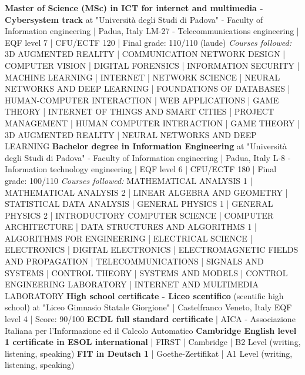 %
%
%


\begin{scholarship}
					{\textbf{Master of Science (MSc) in ICT for internet and multimedia - Cybersystem track}}
	\scholarshipentry{}
	                {at "Università degli Studi di Padova" - Faculty of Information engineering | Padua, Italy}
	\scholarshipentry{}
	                {LM-27 - Telecommunications engineering | EQF level 7 | CFU/ECTF 120 | Final grade: 110/110 (laude)}
	\scholarshipentry{}
	                {\textit{Courses followed:}}
	\scholarshipentry{}
	                {3D AUGMENTED REALITY | COMMUNICATION NETWORK DESIGN | COMPUTER VISION | DIGITAL FORENSICS | INFORMATION SECURITY | MACHINE LEARNING | INTERNET | NETWORK SCIENCE | NEURAL NETWORKS AND DEEP LEARNING | FOUNDATIONS OF DATABASES | HUMAN-COMPUTER INTERACTION | WEB APPLICATIONS | GAME THEORY | INTERNET OF THINGS AND SMART CITIES | PROJECT MANAGEMENT | HUMAN COMPUTER INTERACTION | GAME THEORY | 3D AUGMENTED REALITY | NEURAL NETWORKS AND DEEP LEARNING
	                }
					{\textbf{Bachelor degree in Information Engineering} }
	\scholarshipentry{}
	                {at "Università degli Studi di Padova" - Faculty of Information engineering | Padua, Italy}
	\scholarshipentry{}
	                {L-8 - Information technology engineering | EQF level 6 | CFU/ECTF 180 | Final grade: 100/110}
	\scholarshipentry{}
	                {\textit{Courses followed:}}
	\scholarshipentry{}
	                {MATHEMATICAL ANALYSIS 1 | MATHEMATICAL ANALYSIS 2 | LINEAR ALGEBRA AND GEOMETRY | STATISTICAL DATA ANALYSIS | GENERAL PHYSICS 1 | GENERAL PHYSICS 2 | INTRODUCTORY COMPUTER SCIENCE | COMPUTER ARCHITECTURE | DATA STRUCTURES AND ALGORITHMS 1 | ALGORITHMS FOR ENGINEERING | ELECTRICAL SCIENCE | ELECTRONICS | DIGITAL ELECTRONICS | ELECTROMAGNETIC FIELDS AND PROPAGATION | TELECOMMUNICATIONS | SIGNALS AND SYSTEMS | CONTROL THEORY | SYSTEMS AND MODELS | CONTROL ENGINEERING LABORATORY | INTERNET AND MULTIMEDIA LABORATORY
	                }
					{\textbf{High school certificate - 
					Liceo scentifico} (scentific high school)
					}
	\scholarshipentry{}
	                {at "Liceo Gimnasio Statale Giorgione" |  Castelfranco Veneto, Italy}
	\scholarshipentry{}
	                {EQF level 4 | Score: 90/100}
	                {\textbf{ECDL full standard certificate} | AICA - Associazione Italiana per l'Informazione ed il Calcolo Automatico
	                }                  
	                {\textbf{Cambridge English level 1 certificate in ESOL international} | FIRST | Cambridge | B2 Level (writing, listening, speaking)
	                }
	                {\textbf{FIT in Deutsch 1} | Goethe-Zertifikat | A1 Level (writing, listening, speaking)
	                }
\end{scholarship}